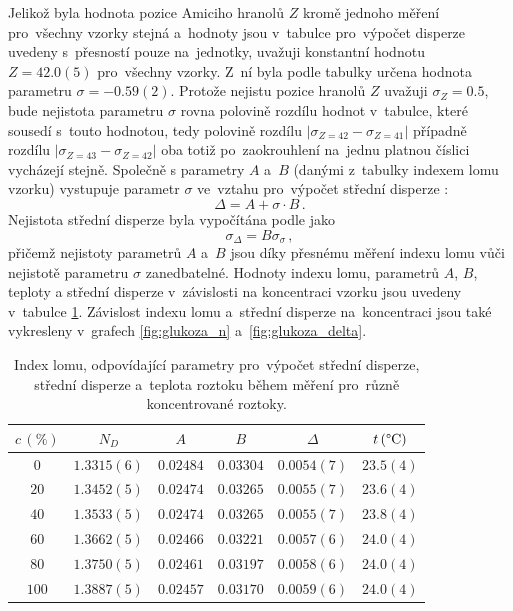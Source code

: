 \documentclass{../concepts/titul_protokol_p/prepareprotokol} %
\begin{document}
Jelikož byla hodnota pozice Amiciho hranolů $Z$ kromě jednoho měření pro~všechny vzorky stejná a~hodnoty 
jsou v~tabulce pro~výpočet disperze uvedeny s~přesností pouze na~jednotky, uvažuji konstantní hodnotu 
$Z = 42.0(5)$ pro~všechny vzorky. Z~ní byla podle tabulky \cite{novex} určena hodnota parametru
$\sigma = -0.59(2)$. Protože nejistu pozice hranolů $Z$ uvažuji $\sigma_Z = 0.5$, bude nejistota 
parametru $\sigma$ rovna polovině rozdílu hodnot v~tabulce, které sousedí s~touto
hodnotou, tedy polovině rozdílu $|\sigma_{Z=42} - \sigma_{Z=41}|$ případně rozdílu $|\sigma_{Z=43} - \sigma_{Z=42}|$
oba totiž po~zaokrouhlení na~jednu platnou číslici vycházejí stejně. Společně s parametry $A$ a~$B$
(danými z~tabulky \cite{novex} indexem lomu vzorku) vystupuje parametr $\sigma$
ve~vztahu pro~výpočet střední disperze \cite{novex}:
\begin{equation}
    \label{eq:delta}
    \Delta = A + \sigma \cdot B \,.
\end{equation}
Nejistota střední disperze byla vypočítána podle \cite{englich} jako
\begin{equation}
    \label{eq:sigma_delta}
    \sigma_\Delta = B \sigma_\sigma \,,
\end{equation}
přičemž nejistoty parametrů $A$ a~$B$ jsou díky přesnému měření indexu lomu vůči nejistotě parametru
$\sigma$ zanedbatelné. Hodnoty indexu lomu, parametrů $A$, $B$, teploty a střední disperze v~závislosti
na koncentraci vzorku jsou uvedeny v~tabulce \ref{tab:glukoza_vsechno}. Závislost indexu lomu
a~střední disperze na~koncentraci jsou také vykresleny v~grafech \ref{fig:glukoza_n} a~\ref{fig:glukoza_delta}.

\begin{table}[!htbp]
\centering
\caption{Index lomu, odpovídající parametry pro~výpočet střední disperze, střední disperze a~teplota
roztoku během měření pro~různě koncentrované roztoky.}
\begin{tabular}{cccccc}
 \toprule
 $c\, (\mathrm{\%})$ & $N_D$ & $A$ & $B$ & $\Delta$ & $t\, (\mathrm{\degree C})$ \\
 \midrule
 $0$ & $1.3315(6)$ & $0.02484$ & $0.03304$ & $0.0054(7)$ & $23.5(4)$ \\
 $20$ & $1.3452(5)$ & $0.02474$ & $0.03265$ & $0.0055(7)$ & $23.6(4)$ \\
 $40$ & $1.3533(5)$ & $0.02474$ & $0.03265$ & $0.0055(7)$ & $23.8(4)$ \\
 $60$ & $1.3662(5)$ & $0.02466$ & $0.03221$ & $0.0057(6)$ & $24.0(4)$ \\
 $80$ & $1.3750(5)$ & $0.02461$ & $0.03197$ & $0.0058(6)$ & $24.0(4)$ \\
 $100$ & $1.3887(5)$ & $0.02457$ & $0.03170$ & $0.0059(6)$ & $24.0(4)$ \\
 \bottomrule
\end{tabular}
\label{tab:glukoza_vsechno}
\end{table}
\end{document}
